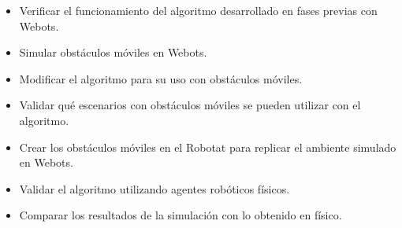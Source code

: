 \begin{itemize}
	\item Verificar el funcionamiento del algoritmo desarrollado en fases previas con Webots.
	\item Simular obstáculos móviles en Webots.
	\item Modificar el algoritmo para su uso con obstáculos móviles.
	\item Validar qué escenarios con obstáculos móviles se pueden utilizar con el algoritmo.
	\item Crear los obstáculos móviles en el Robotat para replicar el ambiente simulado en Webots.
	\item Validar el algoritmo utilizando agentes robóticos físicos.
	\item Comparar los resultados de la simulación con lo obtenido en físico.
\end{itemize}